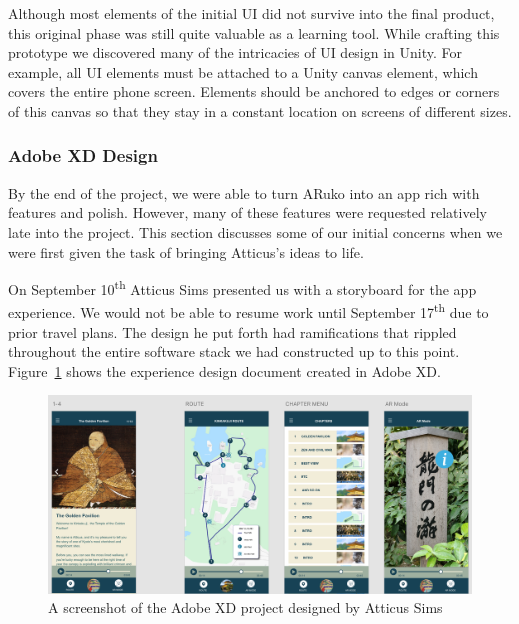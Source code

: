 \documentclass[a4paper, 10pt, american, titlepage]{article}
\begin{document}
Although most elements of the initial UI did not survive into the final product,
this original phase was still quite valuable as a learning tool. While crafting
this prototype we discovered many of the intricacies of UI design in Unity. For
example, all UI elements must be attached to a Unity canvas element, which
covers the entire phone screen. Elements should be anchored to edges or corners
of this canvas so that they stay in a constant location on screens of different
sizes.

\subsubsection{Adobe XD Design}
\label{sec:adobeXdDesign}

By the end of the project, we were able to turn ARuko into an app rich with
features and polish. However, many of these features were requested relatively
late into the project. This section discusses some of our initial concerns when
we were first given the task of bringing Atticus's ideas to life.

On September 10\textsuperscript{th} Atticus Sims presented us with a storyboard
for the app experience. We would not be able to resume work until September
17\textsuperscript{th} due to prior travel plans. The design he put forth had
ramifications that rippled throughout the entire software stack we had
constructed up to this point. Figure~\ref{fig:adobeXdDesign} shows the
experience design document created in Adobe XD.

\begin{figure}[h]
	\centering
	\includegraphics[width=1\textwidth]{adobe-xd-design.png}
	\caption[A screenshot of the Adobe XD project designed by Atticus Sims]
    {A screenshot of the Adobe XD project designed by Atticus Sims}
	\label{fig:adobeXdDesign}
\end{figure}
\end{document}
